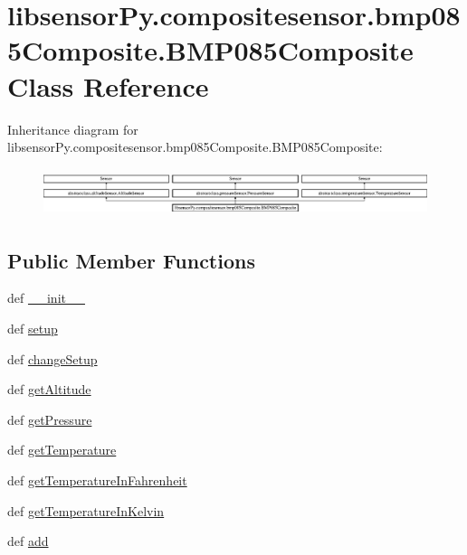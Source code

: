 \hypertarget{classlibsensorPy_1_1compositesensor_1_1bmp085Composite_1_1BMP085Composite}{}\section{libsensor\+Py.\+compositesensor.\+bmp085\+Composite.\+B\+M\+P085\+Composite Class Reference}
\label{classlibsensorPy_1_1compositesensor_1_1bmp085Composite_1_1BMP085Composite}
Inheritance diagram for libsensor\+Py.\+compositesensor.\+bmp085\+Composite.\+B\+M\+P085\+Composite\+:\begin{figure}[H]
\begin{center}
\leavevmode
\includegraphics[height=1.400000cm]{classlibsensorPy_1_1compositesensor_1_1bmp085Composite_1_1BMP085Composite}
\end{center}
\end{figure}
\subsection*{Public Member Functions}
\begin{DoxyCompactItemize}
\item 
def \hyperlink{classlibsensorPy_1_1compositesensor_1_1bmp085Composite_1_1BMP085Composite_afa4ace1b86ca5a2e7b52fcba5b58017f}{\+\_\+\+\_\+init\+\_\+\+\_\+}
\item 
def \hyperlink{classlibsensorPy_1_1compositesensor_1_1bmp085Composite_1_1BMP085Composite_a6668a098b9fb33c251f6f8f8d2a6063d}{setup}
\item 
def \hyperlink{classlibsensorPy_1_1compositesensor_1_1bmp085Composite_1_1BMP085Composite_a0a05eb28d4c346d9b7e3af1cf6070246}{change\+Setup}
\item 
def \hyperlink{classlibsensorPy_1_1compositesensor_1_1bmp085Composite_1_1BMP085Composite_ae35c74f48b6dabcca4a254dd7df6d2c7}{get\+Altitude}
\item 
def \hyperlink{classlibsensorPy_1_1compositesensor_1_1bmp085Composite_1_1BMP085Composite_a01aec854fb261e3ee18a53524ef127d4}{get\+Pressure}
\item 
def \hyperlink{classlibsensorPy_1_1compositesensor_1_1bmp085Composite_1_1BMP085Composite_ab4b338429745bebc4f3b0d71dc663a33}{get\+Temperature}
\item 
def \hyperlink{classlibsensorPy_1_1compositesensor_1_1bmp085Composite_1_1BMP085Composite_a01e59cdb99f873ee104cb5e1fcfb76a5}{get\+Temperature\+In\+Fahrenheit}
\item 
def \hyperlink{classlibsensorPy_1_1compositesensor_1_1bmp085Composite_1_1BMP085Composite_a83cf5140567b9a6bba46a0e7a3f49ecc}{get\+Temperature\+In\+Kelvin}
\item 
def \hyperlink{classlibsensorPy_1_1compositesensor_1_1bmp085Composite_1_1BMP085Composite_ac0349869b84f01df49b54d26bd230625}{add}
\end{DoxyCompactItemize}
